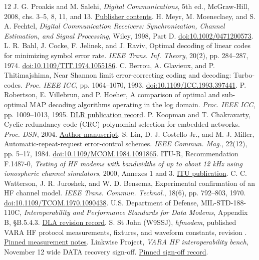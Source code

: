 \documentclass[11pt,letterpaper]{article}
\begin{document}
\clearpage
\begin{thebibliography}{12}
 J. G. Proakis and M. Salehi, \emph{Digital Communications},
5th ed., McGraw-Hill, 2008, chs. 3--5, 8, 11, and 13.
\href{https://glencoe.mheducation.com/sites/0072957166/information_center_view0/table_of_contents.html}{Publisher contents}.
 H. Meyr, M. Moeneclaey, and S. A. Fechtel,
\emph{Digital Communication Receivers: Synchronization, Channel Estimation,
and Signal Processing}, Wiley, 1998, Part D.
\href{https://doi.org/10.1002/0471200573}{doi:10.1002/0471200573}.
 L. R. Bahl, J. Cocke, F. Jelinek, and J. Raviv,
Optimal decoding of linear codes for minimizing symbol error rate.
\emph{IEEE Trans. Inf. Theory}, 20(2), pp. 284--287, 1974.
\href{https://doi.org/10.1109/TIT.1974.1055186}{doi:10.1109/TIT.1974.1055186}.
 C. Berrou, A. Glavieux, and P. Thitimajshima,
Near Shannon limit error-correcting coding and decoding: Turbo-codes.
\emph{Proc. IEEE ICC}, pp. 1064--1070, 1993.
\href{https://doi.org/10.1109/ICC.1993.397441}{doi:10.1109/ICC.1993.397441}.
 P. Robertson, E. Villebrun, and P. Hoeher,
A comparison of optimal and sub-optimal MAP decoding algorithms operating
in the log domain. \emph{Proc. IEEE ICC}, pp. 1009--1013, 1995.
\href{https://elib.dlr.de/34203/}{DLR publication record}.
 P. Koopman and T. Chakravarty,
Cyclic redundancy code (CRC) polynomial selection for embedded networks.
\emph{Proc. DSN}, 2004.
\href{https://users.ece.cmu.edu/~koopman/roses/dsn04/koopman04_crc_poly_embedded.pdf}{Author manuscript}.
 S. Lin, D. J. Costello Jr., and M. J. Miller,
Automatic-repeat-request error-control schemes.
\emph{IEEE Commun. Mag.}, 22(12), pp. 5--17, 1984.
\href{https://doi.org/10.1109/MCOM.1984.1091865}{doi:10.1109/MCOM.1984.1091865}.
 ITU-R, Recommendation F.1487-0,
\emph{Testing of HF modems with bandwidths of up to about 12 kHz using
ionospheric channel simulators}, 2000, Annexes 1 and 3.
\href{https://www.itu.int/rec/R-REC-F.1487-0-200005-I/en}{ITU publication}.
 C. C. Watterson, J. R. Juroshek, and W. D. Bensema,
Experimental confirmation of an HF channel model.
\emph{IEEE Trans. Commun. Technol.}, 18(6), pp. 792--803, 1970.
\href{https://doi.org/10.1109/TCOM.1970.1090438}{doi:10.1109/TCOM.1970.1090438}.
 U.S. Department of Defense, MIL-STD-188-110C,
\emph{Interoperability and Performance Standards for Data Modems},
Appendix B, \S B.5.4.3.
\href{https://quicksearch.dla.mil/qsDocDetails.aspx?ident_number=35569}{DLA revision record}.
 S. St John (W9SSJ), \emph{hfmodem}, published VARA HF
protocol measurements, fixtures, and waveform constants, revision
.
\href{https://github.com/sstjohn/hfmodem/tree/952f79245240132f4af209afbad1f4b2ba256613/docs/protocols/vara}{Pinned measurement notes}.
 Linkwise Project, \emph{VARA HF interoperability bench},
November 12 wide DATA recovery sign-off.
\href{https://github.com/8r4n/linkwise/blob/dcf1aa549f6affb6818e33ceb0ade51cd48dacb1/docs/testing/vara-interoperability.md\#november-12-wide-data-recovery-sign-off}{Pinned sign-off record}.
\end{thebibliography}
\end{document}
